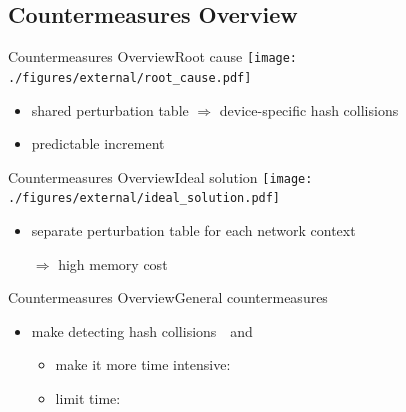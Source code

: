 \documentclass[aspectratio=169, hyperref={colorlinks=true, allcolors=SecondaryColor}, c]{beamer}
\begin{document}
	\subsection{Countermeasures Overview}

	\begin{frame}[fragile]{Countermeasures Overview}{Root cause}
		\texttt{[image: ./figures/external/root\_cause.pdf]} %
		\begin{itemize}
			\item shared perturbation table \alert{$\Rightarrow$} device-specific hash collisions %
			\item predictable increment
		\end{itemize}
	\end{frame}

	\begin{frame}[fragile]{Countermeasures Overview}{Ideal solution}
		\texttt{[image: ./figures/external/ideal\_solution.pdf]} %
		\begin{itemize}
			\item separate perturbation table for each network context
			\item[\alert{$\Rightarrow$}] high memory cost %
		\end{itemize}
	\end{frame}

	\begin{frame}[fragile]{Countermeasures Overview}{General countermeasures}
		\begin{itemize}
			\item make detecting hash collisions \,{\thickuparrow}\, and \,{\thickdownarrow}\,
			\begin{itemize}
				\item \alert{make it more time intensive}:

				\item \alert{limit time}:
				\vspace{-0.2cm}

			\end{itemize}
		\end{itemize}
	\end{frame}
\end{document}
